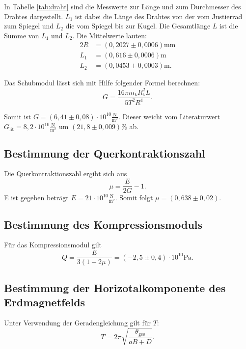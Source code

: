 In Tabelle \ref{tab:draht} sind die Messwerte zur Länge und zum Durchmesser des Drahtes dargestellt. $L_1$ ist dabei die Länge des Drahtes von der vom Justierrad zum Spiegel und $L_2$ die vom Spiegel bis zur Kugel. Die Gesamtlänge $L$ ist die Summe von $L_1$ und $L_2$.
Die Mittelwerte lauten:
\begin{align}
  2R&=(0,2027 \pm 0,0006)\si{\milli\meter} \\
  L_1&=(0,616 \pm 0,0006)\si{\meter} \\
  L_2&=(0,0453 \pm 0,0003) \si{\meter}.
\end{align}

Das Schubmodul lässt sich mit Hilfe folgender Formel berechnen:
\begin{equation}
  G = \frac{16\pi m_\mathrm{k} R_\mathrm{k}^2 L}{5T^2 R^4}.
\end{equation}

Somit ist $G=(6,41 \pm 0,08)\cdot 10^{10} \frac{\si{\newton}}{\si{\meter}^2}$.
Dieser weicht vom Literaturwert $G_\mathrm{lit} = 8,2 \cdot 10^{10}\frac{\si{\newton}}{\si{\meter}^2}$ um $(21,8 \pm 0,009)\%$ ab.

\subsection{Bestimmung der Querkontraktionszahl}
Die Querkontraktionszahl ergibt sich aus
\begin{equation}
  \mu = \frac{E}{2G}-1.
\end{equation}
E ist gegeben beträgt $E=21 \cdot 10^{10} \frac{\si{\newton}}{\si{\meter}^2}$.
Somit folgt $\mu = (0,638 \pm 0,02)$.

\subsection{Bestimmung des Kompressionsmoduls}
 Für das Kompressionsmodul gilt
 \begin{equation}
   Q = \frac{E}{3(1-2\mu)} = (-2,5 \pm 0,4)\cdot 10^{10} \si{\pascal}.
\end{equation}


\subsection{Bestimmung der Horizotalkomponente des Erdmagnetfelds}

Unter Verwendung der Geradengleichung gilt für $T$:
\begin{equation}
  T = 2\pi \sqrt{\frac{\theta_\mathrm{ges}}{aB+D}}.
\end{equation}

